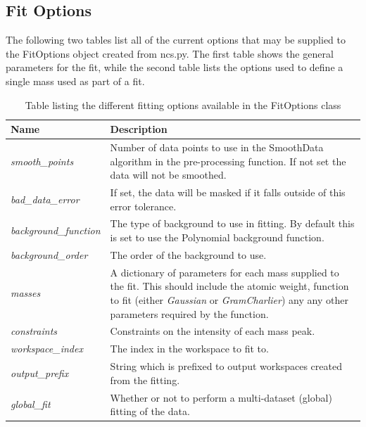 \documentclass[paper=a4, fontsize=11pt]{scrartcl}	%
\numberwithin{equation}{section}															%
\numberwithin{figure}{section}																%
\numberwithin{table}{section}
\begin{document}
\begin{appendices}
\section{Fit Options}
\label{sec:fit-options}
The following two tables list all of the current options that may be supplied to the FitOptions object created from ncs.py. The first table shows the general parameters for the fit, while the second table lists the options used to define a single mass used as part of a fit.

\begin{table}[H]
\centering
\begin{tabular}{ l p{12cm}}
Name & Description \\ \hline
\textit{smooth\_points} & Number of data points to use in the SmoothData algorithm in the pre-processing function. If not set the data will not be smoothed. \\ \hline
\textit{bad\_data\_error} & If set, the data will be masked if it falls outside of this error tolerance.\\ \hline
\textit{background\_function} & The type of background to use in fitting. By default this is set to use the Polynomial background function. \\ \hline
\textit{background\_order} & The order of the background to use.\\ \hline
\textit{masses} & A dictionary of parameters for each mass supplied to the fit. This should include the atomic weight, function to fit (either \textit{Gaussian} or \textit{GramCharlier}) any any other parameters required by the function. \\ \hline
\textit{constraints} & Constraints on the intensity of each mass peak. \\ \hline
\textit{workspace\_index} & The index in the workspace to fit to. \\ \hline
\textit{output\_prefix} & String which is prefixed to output workspaces created from the fitting. \\ \hline
\textit{global\_fit} & Whether or not to perform a multi-dataset (global) fitting of the data. \\ \hline
\end{tabular}
\caption{Table listing the different fitting options available in the FitOptions class}
\label{table:fit-parameters}
\end{table}


\end{appendices}
\end{document}
